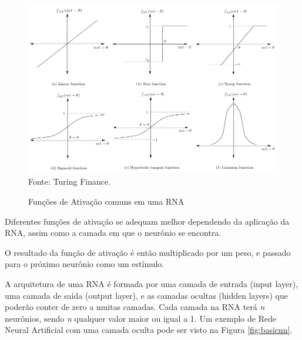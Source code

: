 \documentclass[12pt,a4paper]{article}
\newcommand{\source}[1]{\small Fonte: {#1}}
\begin{document}
	\begin{figure}[ht!]
		\caption{Funções de Ativação comuns em uma RNA}
		\centering
		\includegraphics[scale=0.3]{ActivationFunctions.png}\\
		\vspace{0.5mm}
		\source{Turing Finance.}
		\label{fig:activationFunctions}
	\end{figure}
	
	Diferentes funções de ativação se adequam melhor dependendo da aplicação da RNA,
	assim como a camada em que o neurônio se encontra.
	
	O resultado da função de ativação é então multiplicado por um peso,
	e passado para o próximo neurônio como um estímulo.
	
	A arquitetura de uma RNA é formada por uma camada de entrada (input layer),
	uma camada de saída (output layer),
	e as camadas ocultas (hidden layers)
	que poderão conter de zero a muitas camadas.
	Cada camada na RNA terá \textit{n} neurônios,
	sendo \textit{n} qualquer valor maior ou igual a 1.
	Um exemplo de Rede Neural Artificial com uma camada oculta pode ser visto na Figura \ref{fig:basicnn}.
	
\end{document}
